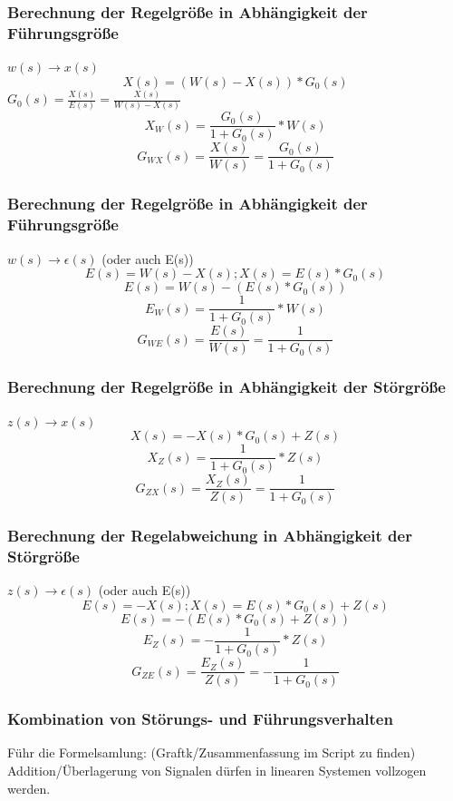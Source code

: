 \documentclass{article}
\begin{document}
\subsubsection*{Berechnung der Regelgröße in Abhängigkeit der Führungsgröße}
$w(s) \rightarrow x(s)$
\[
X(s)=(W(s)-X(s)) * G_0(s)
\]
$G_0(s)=\frac{X(s)}{E(s)} = \frac{X(s)}{W(s)-X(s)}$
\[
X_W(s)=\frac{G_0(s)}{1+G_0(s)} * W(s)
\]
\[
G_{WX}(s)=\frac{X(s)}{W(s)} = \frac{G_0(s)}{1+G_0(s)}
\]

\subsubsection*{Berechnung der Regelgröße in Abhängigkeit der Führungsgröße}
$w(s) \rightarrow \epsilon(s)$ (oder auch E(s))
\[
E(s)=W(s)-X(s); X(s)=E(s)*G_0(s)
\]
\[
E(s)=W(s)-(E(s)*G_0(s))
\]
\[
E_W(s)=\frac{1}{1+G_0(s)}*W(s)
\]
\[
G_{WE}(s)=\frac{E(s)}{W(s)}=\frac{1}{1+G_0(s)}
\]

\subsubsection*{Berechnung der Regelgröße in Abhängigkeit der Störgröße}
$z(s) \rightarrow x(s)$
\[
X(s)=-X(s)*G_0(s)+Z(s)
\]
\[
X_Z(s)=\frac{1}{1+G_0(s)}*Z(s)
\]
\[
G_{ZX}(s)=\frac{X_Z(s)}{Z(s)}=\frac{1}{1+G_0(s)}
\]

\subsubsection*{Berechnung der Regelabweichung in Abhängigkeit der Störgröße}
$z(s) \rightarrow \epsilon(s)$ (oder auch E(s))
\[
E(s)=-X(s); X(s) = E(s) * G_0(s)+Z(s)
\]
\[
E(s)=-(E(s)*G_0(s)+Z(s))
\]
\[
E_Z(s)=-\frac{1}{1+G_0(s)}*Z(s)
\]
\[
G_{ZE}(s)=\frac{E_Z(s)}{Z(s)}=-\frac{1}{1+G_0(s)}
\]

\subsubsection*{Kombination von Störungs- und Führungsverhalten}
Führ die Formelsamlung: (Graftk/Zusammenfassung im Script zu finden) \\
Addition/Überlagerung von Signalen dürfen in linearen Systemen vollzogen werden.
\end{document}
